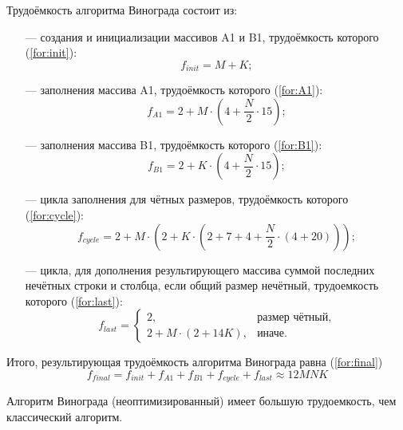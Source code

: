 Трудоёмкость алгоритма Винограда состоит из:
\begin{itemize}
	\item[---] создания и инициализации массивов A1 и B1, трудоёмкость которого (\ref{for:init}):
	\begin{equation}
		\label{for:init}
		f_{init} = M + K;
	\end{equation}
	
	\item[---] заполнения массива A1, трудоёмкость которого (\ref{for:A1}):
	\begin{equation}
		\label{for:A1}
		f_{A1} = 2 + M \cdot (4 + \frac{N}{2} \cdot 15);
	\end{equation}
	
	\item[---] заполнения массива B1, трудоёмкость которого (\ref{for:B1}):
	\begin{equation}
		\label{for:B1}
		f_{B1} = 2 + K \cdot (4 + \frac{N}{2} \cdot 15);
	\end{equation}
	
	\item[---] цикла заполнения для чётных размеров, трудоёмкость которого (\ref{for:cycle}):
	\begin{equation}
		\label{for:cycle}
		f_{cycle} = 2 + M \cdot (2 + K \cdot (2 + 7 + 4 + \frac{N}{2} \cdot (4 + 20)));		
	\end{equation}
	
	\item[---] цикла, для дополнения результирующего массива суммой последних нечётных строки и столбца, если общий размер нечётный, трудоемкость которого (\ref{for:last}):
	\begin{equation}
		\label{for:last}
		f_{last} = \begin{cases}
			2, & \text{размер чётный,}\\
			2 + M \cdot (2 + 14K), & \text{иначе.}
		\end{cases}
	\end{equation}
\end{itemize}

Итого, результирующая трудоёмкость алгоритма Винограда равна (\ref{for:final})
\begin{equation}
	\label{for:final}
	f_{final} = f_{init} + f_{A1} + f_{B1} + f_{cycle} + f_{last} \approx 12MNK
\end{equation}

Алгоритм Винограда (неоптимизированный) имеет большую трудоемкость, чем классический алгоритм.

